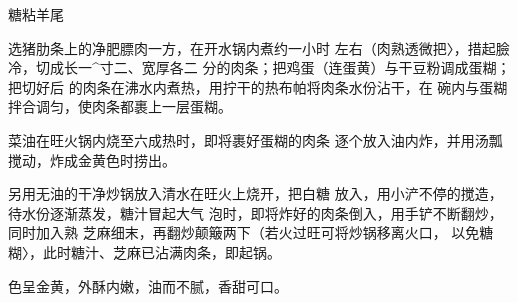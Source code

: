 \begin{recipe}{糖粘羊尾}

\ingredients



\cooking

\step 	选猪肋条上的净肥膘肉一方，在开水锅内煮约一小时 左右（肉熟透微把〉，措起臉冷，切成长一^寸二、宽厚各二 分的肉条；把鸡蛋（连蛋黄）与干豆粉调成蛋糊；把切好后 的肉条在沸水内煮热，用拧干的热布帕将肉条水份沾干，在 碗内与蛋糊拌合调匀，使肉条都裹上一层蛋糊。

\step 	菜油在旺火锅内烧至六成热时，即将裹好蛋糊的肉条 逐个放入油内炸，并用汤瓢搅动，炸成金黄色时捞出。

\step 	另用无油的干净炒锅放入清水在旺火上烧开，把白糖 放入，用小浐不停的搅造，待水份逐渐蒸发，糖汁冒起大气 泡时，即将炸好的肉条倒入，用手铲不断翻炒，同时加入熟 芝麻细末，再翻炒颠簸两下（若火过旺可将炒锅移离火口， 以免糖糊〉，此时糖汁、芝麻已沾满肉条，即起锅。

\notes

色呈金黄，外酥内嫩，油而不腻，香甜可口。

\end{recipe}

